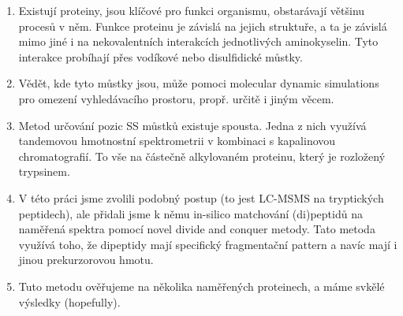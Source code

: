

\begin{enumerate}
  \item Existují proteiny, jsou klíčové pro funkci organismu, obstarávají většinu procesů v něm. Funkce proteinu je závislá na jejich struktuře, a ta je závislá mimo jiné i na nekovalentních interakcích jednotlivých aminokyselin. Tyto interakce probíhají přes vodíkové nebo disulfidické můstky.
  \item Vědět, kde tyto můstky jsou, může pomoci molecular dynamic simulations pro omezení vyhledávacího prostoru, propř. určitě i jiným věcem.
  \item Metod určování pozic SS můstků existuje spousta. Jedna z nich využívá tandemovou hmotnostní spektrometrii v kombinaci s kapalinovou chromatografií. To vše na částečně alkylovaném proteinu, který je rozložený trypsinem.
  \item V této práci jsme zvolili podobný postup (to jest LC-MSMS na tryptických peptidech), ale přidali jsme k němu in-silico matchování (di)peptidů na naměřená spektra pomocí novel divide and conquer metody. Tato metoda využívá toho, že dipeptidy mají specifický fragmentační pattern a navíc mají i jinou prekurzorovou hmotu.
  \item Tuto metodu ověřujeme na několika naměřených proteinech, a máme svkělé výsledky (hopefully).
\end{enumerate}




